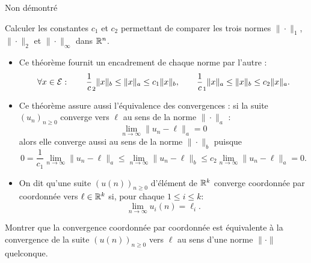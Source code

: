 \proof Non démontré \eproof

\begin{exercise*}
  Calculer les constantes $c_1$ et $c_2$ permettant de comparer les trois normes $\|\cdot\|_1$, $\|\cdot\|_2$ et $\|\cdot\|_\infty$ dans $\mathbb{R}^n$.
\end{exercise*}

\remark
\begin{itemize}
  \item Ce théorème fournit un encadrement de chaque norme par l'autre : 
  $$
  \forall x \in \mathcal{E}: \qquad
  \frac1c_2 \|x\|_b \leq \|x\|_a \leq c_1 \|x\|_b, \qquad
  \frac1c_1 \|x\|_a \leq \|x\|_b \leq c_2 \|x\|_a.
  $$
  \item Ce théorème assure aussi l'équivalence des convergences : si la suite $(u_n)_{n \geq 0}$ converge vers $\ell$ au sens de la norme $\|\cdot\|_a$ :
  $$
  \lim_{n \rightarrow \infty} \|u_n - \ell\|_a = 0
  $$
  alors elle converge aussi au sens de la norme $\|\cdot\|_b$ puisque
  $$
  0 = \frac1{c_1} \lim_{n \rightarrow \infty} \|u_n - \ell\|_a
  \leq \lim_{n \rightarrow \infty} \|u_n - \ell\|_b \leq
  c_2 \lim_{n \rightarrow \infty} \|u_n - \ell\|_a = 0.
  $$
  \item On dit qu'une suite $(u(n))_{n \geq 0}$ d'élément de $\mathbb{R}^k$ converge coordonnée par coordonnée vers $\ell \in \mathbb{R}^k$ si, pour chaque $1 \leq i \leq k$:
  $$
  \lim_{n \rightarrow \infty} u_i(n) = \ell_i.
  $$
\end{itemize}

\begin{exercise*}
  Montrer que la convergence coordonnée par coordonnée est équivalente à la convergence de la suite $(u(n))_{n \geq 0}$ vers $\ell$ au sens d'une norme $\|\cdot\|$ quelconque.
\end{exercise*}

